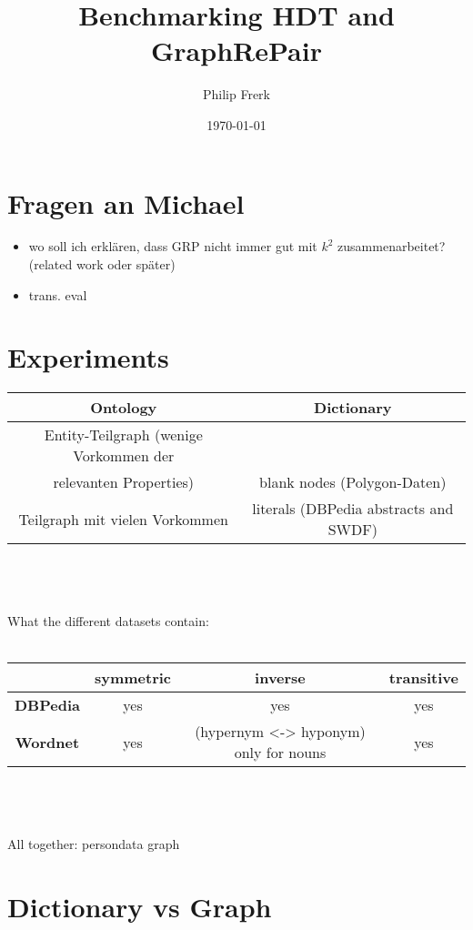 \documentclass[a4paper]{scrartcl}
\title{Benchmarking HDT and GraphRePair}
\author{Philip Frerk}
\date{\today}
\begin{document}
\maketitle


\section{Fragen an Michael}

\begin{itemize}
	\item wo soll ich erklären, dass GRP nicht immer gut mit $k^2$ zusammenarbeitet? (related work oder später)
	\item trans. eval
\end{itemize}

\section{Experiments}

\begin{tabular}{|c|c|}
	\hline 
	\textbf{Ontology} & \textbf{Dictionary} \\ 
	\hline 
	Entity-Teilgraph (wenige Vorkommen der \\relevanten Properties) & blank nodes (Polygon-Daten) \\ 
	\hline 
	Teilgraph mit vielen Vorkommen & literals (DBPedia abstracts and SWDF) \\ 
	\hline 
\end{tabular} 
\\\\\\What the different datasets contain:\\\\
\begin{tabular}{|c|c|c|c|}
	\hline 
	& \textbf{symmetric} & \textbf{inverse} & \textbf{transitive} \\ 
	\hline 
	\textbf{DBPedia} & yes & yes & yes \\ 
	\hline 
	\textbf{Wordnet} & yes & (hypernym <-> hyponym) only for nouns & yes \\ 
	\hline 
\end{tabular} 
\\\\\\All together: persondata graph

\section{Dictionary vs Graph}
\end{document}
